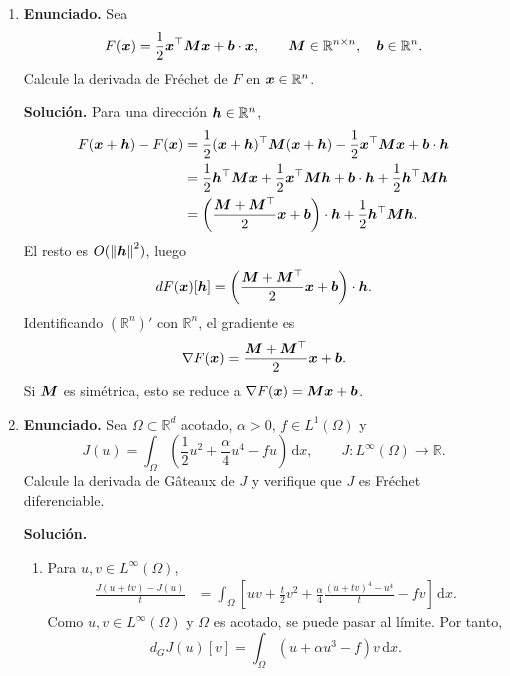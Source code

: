 \documentclass[11pt]{article}
\newcommand{\norm}[1]{\left\lVert #1\right\rVert}
\def\vec   #1{\mbox{\boldmath $#1$}{}}
\def\ten   #1{\mbox{\boldmath $#1$}{}}
\def\dx{\mbox{\(\,\mathrm{d}x\)}}
\def\R{\mathbb R}
\begin{document}
\begin{enumerate}[label=\textbf{\arabic*.}, leftmargin=*]

    \item \textbf{Enunciado.} Sea
    \[
        F(\vec x)=\frac12\vec x^\top\ten M\vec x+\vec b\cdot\vec x,
        \qquad
        \ten M\in\R^{n\times n},\quad \vec b\in\R^n.
    \]
    Calcule la derivada de Fréchet de $F$ en $\vec x\in\R^n$.

    \textbf{Solución.} Para una dirección $\vec h\in\R^n$,
    \begin{align*}
        F(\vec x+\vec h)-F(\vec x)
        &=\frac12(\vec x+\vec h)^\top\ten M(\vec x+\vec h)-\frac12\vec x^\top\ten M\vec x+\vec b\cdot\vec h\\
        &=\frac12\vec h^\top\ten M\vec x+\frac12\vec x^\top\ten M\vec h+\vec b\cdot\vec h+\frac12\vec h^\top\ten M\vec h\\
        &=\left(\frac{\ten M+\ten M^\top}{2}\vec x+\vec b\right)\cdot\vec h+\frac12\vec h^\top\ten M\vec h.
    \end{align*}
    El resto es $O(\norm{\vec h}^2)$, luego
    \[
        dF(\vec x)[\vec h]
        =
        \left(\frac{\ten M+\ten M^\top}{2}\vec x+\vec b\right)\cdot\vec h.
    \]
    Identificando $(\R^n)'$ con $\R^n$, el gradiente es
    \[
        \nabla F(\vec x)=\frac{\ten M+\ten M^\top}{2}\vec x+\vec b.
    \]
    Si $\ten M$ es simétrica, esto se reduce a $\nabla F(\vec x)=\ten M\vec x+\vec b$.

    \item \textbf{Enunciado.} Sea $\Omega\subset\R^d$ acotado, $\alpha>0$, $f\in L^1(\Omega)$ y
    \[
        J(u)=\int_\Omega\left(\frac12u^2+\frac{\alpha}{4}u^4-fu\right)\dx,
        \qquad
        J:L^\infty(\Omega)\to\R.
    \]
    Calcule la derivada de Gâteaux de $J$ y verifique que $J$ es Fréchet diferenciable.

    \textbf{Solución.}
    \begin{enumerate}[label=(\alph*)]
        \item Para $u,v\in L^\infty(\Omega)$,
        \begin{align*}
            \frac{J(u+t v)-J(u)}{t}
            &=
            \int_\Omega
            \left[
            uv+\frac{t}{2}v^2
            +\frac{\alpha}{4}\frac{(u+tv)^4-u^4}{t}
            -fv
            \right]\dx.
        \end{align*}
        Como $u,v\in L^\infty(\Omega)$ y $\Omega$ es acotado, se puede pasar al límite. Por tanto,
        \[
            d_GJ(u)[v]
            =
            \int_\Omega (u+\alpha u^3-f)v\dx.
        \]


\end{enumerate}
\end{enumerate}
\end{document}
